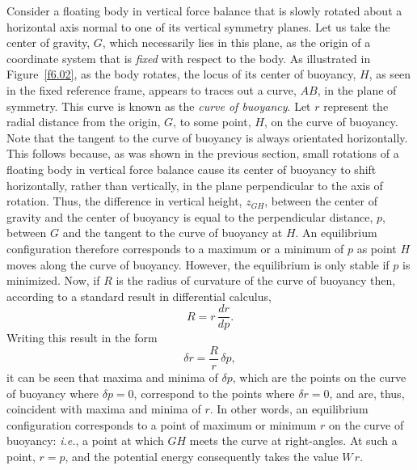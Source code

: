 Consider a floating body in vertical force balance that is slowly rotated about a horizontal axis normal to one of  its vertical symmetry planes.
Let us take the center of gravity, $G$, which necessarily lies in this plane, as the origin of a coordinate system that is {\em fixed}\/ with respect to the body.  
As illustrated in Figure~\ref{f6.02}, as the body rotates, the locus of its center of buoyancy, $H$, as seen in the fixed reference frame, appears to traces out a curve, $AB$,
in the plane of symmetry.  
This curve is known as the {\em curve of buoyancy}. Let $r$ represent the radial distance from the origin, $G$,
to some point, $H$, on the curve of buoyancy. Note that the tangent to the curve of buoyancy is always orientated
horizontally. This follows because, as was shown in the previous section, small rotations of a floating body in vertical force balance
cause its center of buoyancy to shift horizontally, rather than vertically, in the plane perpendicular to the axis of rotation.
Thus, the  difference in vertical height, $z_{GH}$, between the center of
gravity and the center of buoyancy is equal to the perpendicular distance, $p$, between $G$ and the  tangent
to the curve of buoyancy at $H$. An  equilibrium configuration therefore corresponds to a maximum or a minimum of $p$ as
point $H$ moves along the curve of buoyancy. However, the equilibrium is only stable if $p$ is minimized.  Now, if $R$ is the radius of curvature of the
curve of buoyancy then, according to a standard result in differential calculus, 
\begin{equation}
R = r\,\frac{dr}{dp}.
\end{equation}
Writing this result in the form
\begin{equation}
\delta r = \frac{R}{r}\,\delta p,
\end{equation}
it can be seen that maxima and minima of $\delta p$, which are the points on the
curve of buoyancy where  $\delta p =0$, correspond to the points where  $\delta r= 0$, and are,
thus,  coincident with maxima and minima of $r$. In other words, an equilibrium configuration corresponds to
a point of maximum or minimum $r$ on the curve of buoyancy: {\em i.e.}, a point at which $GH$ meets the
curve at right-angles. At such a point, $r=p$, and the potential energy consequently takes the value $W\,r$. 

